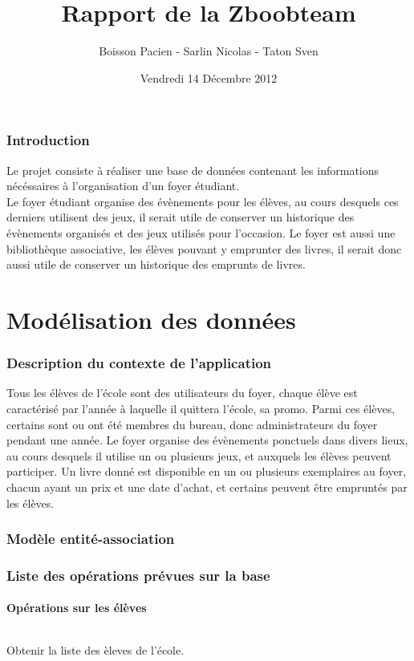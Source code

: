 \documentclass[a4paper, 11pt]{article}
\title{Rapport de la Zboobteam}
\author{Boisson Pacien - Sarlin Nicolas - Taton Sven}
\date{Vendredi 14 Décembre 2012}
\begin{document}
\maketitle
\tableofcontents
\newpage
\section{Introduction}
Le projet consiste à réaliser une base de données contenant les informations nécéssaires à l'organisation d'un foyer étudiant.\\
Le foyer étudiant organise des évènements pour les élèves, au cours desquels ces derniers utilisent des jeux, il serait utile de conserver un historique des évènements organisés et des jeux utilisés pour l'occasion. Le foyer est aussi une bibliothèque associative, les élèves pouvant y emprunter des livres, il serait donc aussi utile de conserver un historique des emprunts de livres.
\newpage
\part{Modélisation des données}
\setcounter{section}{0}
\section{Description du contexte de l'application}
Tous les élèves de l'école sont des utilisateurs du foyer, chaque élève est caractérisé par l'année à laquelle il quittera l'école, sa promo. Parmi ces élèves, certains sont ou ont été membres du bureau, donc administrateurs du foyer pendant une année. Le foyer organise des évènements ponctuels dans divers lieux, au cours desquels il utilise un ou plusieurs jeux, et auxquels les élèves peuvent participer. Un livre donné est disponible en un ou plusieurs exemplaires au foyer, chacun ayant un prix et une date d'achat, et certains peuvent être empruntés par les élèves.
\section{Modèle entité-association}
\section{Liste des opérations prévues sur la base}
\subsection{Opérations sur les élèves}
\paragraph{}
Obtenir la liste des èleves de l'école.
\end{document}
